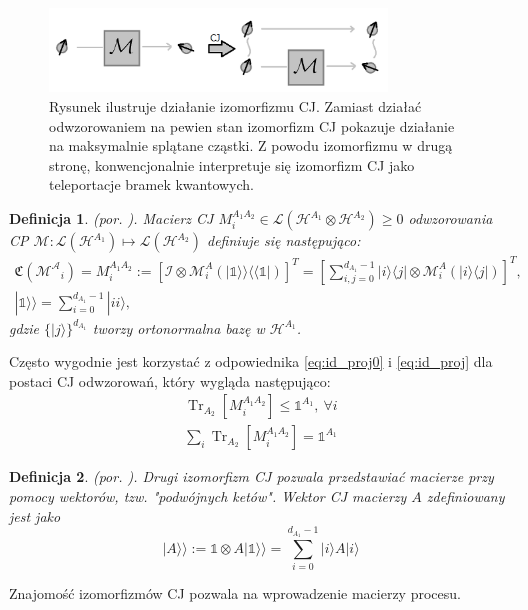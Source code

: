 \documentclass[10pt]{article} %
\newtheorem{definicja}{Definicja}
\DeclareMathOperator{\Trs}{Tr}
\newcommand{\Mats}[1]{\mathcal{L}(#1)}
\newcommand{\Hx}[1]{\mathcal{H}^{#1}}
\newcommand{\HAi}{\Hx{A_1}}
\newcommand{\MXi}[3]{\mathcal{M}^{#1}_{#2}(#3)}
\newcommand{\MAi}[1]{\MXi{A}{i}{#1}}
\newcommand{\Ket}[1]{|#1\rangle}
\newcommand{\Bra}[1]{\langle#1|}
\newcommand{\BBra}[1]{\langle\langle#1|}
\newcommand{\KKet}[1]{|#1\rangle\rangle}
\newcommand{\I}{\mathbb{1}}
\newcommand{\MCJ}{\mathfrak{C}}
\begin{document}
\begin{figure}[t]
\centering
\includegraphics[width=0.8\textwidth]{obrazki/cj_new}
\caption{Rysunek ilustruje działanie izomorfizmu CJ. Zamiast działać odwzorowaniem na pewien stan izomorfizm CJ pokazuje działanie na maksymalnie splątane cząstki. Z powodu izomorfizmu w drugą stronę, konwencjonalnie interpretuje się izomorfizm CJ jako teleportacje bramek kwantowych.}
\end{figure}
\begin{definicja}
(por. \cite{cj_iso1, cj_iso2}).
Macierz CJ $M^{A_1A_2}_i \in \Mats{\Hx{A_1} \otimes \Hx{A_2}} \geq 0$ odwzorowania CP $\mathcal{M}: \mathcal{L}(\Hx{A_1}) \mapsto \mathcal{L}(\Hx{A_2})$ definiuje się następująco:
\begin{gather}
\label{eq:cj_iso}
\MCJ(\mathcal{M^A}_i)= M^{A_1A_2}_i := [\mathcal{I} \otimes \MAi{ \KKet{\I} \BBra{\I}}]^T= \left[\sum^{d_{A_1}-1}_{i,j=0} \Ket{i}\Bra{j} \otimes \mathcal{M}^A_i(\Ket{i}\Bra{j})\right]^T, \\
\KKet{\I} = \sum^{d_{A_1}-1}_{i=0} \Ket{ii},
\end{gather}
gdzie $\{\Ket{j}\}^{d_{A_1}}$ tworzy ortonormalna bazę w $\HAi$. 
\end{definicja}
Często wygodnie jest korzystać z odpowiednika \eqref{eq:id_proj0} i \eqref{eq:id_proj} dla postaci CJ odwzorowań, który wygląda następująco:
\begin{gather}
\Trs_{A_2} \left[ M^{A_1A_2}_i \right] \leq \I^{A_1},~\forall i\\ 
\sum_i \Trs_{A_2} \left[ M^{A_1A_2}_i \right] = \I^{A_1}
\end{gather}
\begin{definicja}
(por. \cite{cj_iso1, cj_iso2}).
Drugi izomorfizm CJ pozwala przedstawiać macierze przy pomocy wektorów, tzw. "podwójnych ketów". Wektor CJ macierzy $A$ zdefiniowany jest jako
\begin{equation}
\KKet{A} := \I \otimes A\KKet{\I} = \sum^{d_{A_1}-1}_{i=0} \Ket{i} A \Ket{i}
\end{equation}
\end{definicja}
Znajomość izomorfizmów CJ pozwala na wprowadzenie macierzy procesu.
\end{document}
